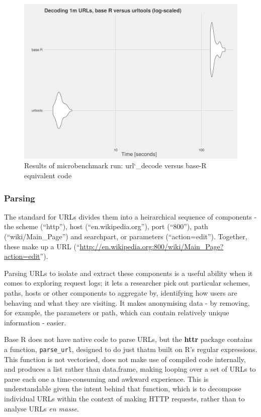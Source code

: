 \begin{figure}[h]
    \centering
    \includegraphics[scale=0.4]{decoding_benchmarks}
    \caption{Results of microbenchmark run: url\char`_decode versus base-R equivalent code}
\end{figure}

\subsubsection{Parsing}\label{parsing}

The standard for URLs \citep{RFC1738} divides them into a heirarchical
sequence of components - the scheme (``http''), host
(``en.wikipedia.org''), port (``800''), path (``wiki/Main\_Page'') and
searchpart, or parameters (``action=edit''). Together, these make up a
URL (``\url{http://en.wikipedia.org:800/wiki/Main_Page?action=edit}'').

Parsing URLs to isolate and extract these components is a useful ability
when it comes to exploring request logs; it lets a researcher pick out
particular schemes, paths, hosts or other components to aggregate by,
identifying how users are behaving and what they are visiting. It makes
anonymising data - by removing, for example, the parameters or path,
which can contain relatively unique information - easier.

Base R does not have native code to parse URLs, but the \textbf{httr}
package \citep{httr} contains a function, \texttt{parse\_url}, designed
to do just thatm built on R's regular expressions. This function is not
vectorised, does not make use of compiled code internally, and produces
a list rather than data.frame, making looping over a set of URLs to
parse each one a time-consuming and awkward experience. This is
understandable given the intent behind that function, which is to
decompose individual URLs within the context of making HTTP requests,
rather than to analyse URLs \emph{en masse}.

